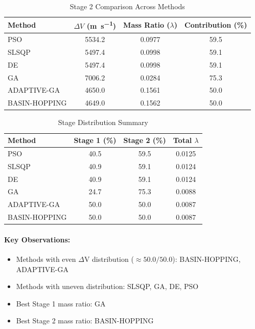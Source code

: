 \documentclass{article}
\begin{document}
\begin{table}[H]
\centering
\caption{Stage 2 Comparison Across Methods}
\begin{tabular}{lS[table-format=4.1]S[table-format=1.4]S[table-format=3.1]}
\toprule
Method & {$\Delta V$ (\si{\meter\per\second})} & {Mass Ratio ($\lambda$)} & {Contribution (\%)} \\
\midrule
PSO          & 5534.2 & 0.0977 & 59.5 \\
SLSQP        & 5497.4 & 0.0998 & 59.1 \\
DE           & 5497.4 & 0.0998 & 59.1 \\
GA           & 7006.2 & 0.0284 & 75.3 \\
ADAPTIVE-GA  & 4650.0 & 0.1561 & 50.0 \\
BASIN-HOPPING & 4649.0 & 0.1562 & 50.0 \\
\bottomrule
\end{tabular}
\end{table}

\begin{table}[H]
\centering
\caption{Stage Distribution Summary}
\begin{tabular}{lS[table-format=4.1]S[table-format=4.1]S[table-format=1.4]}
\toprule
Method & {Stage 1 (\%)} & {Stage 2 (\%)} & {Total $\lambda$} \\
\midrule
PSO          & 40.5 & 59.5 & 0.0125 \\
SLSQP        & 40.9 & 59.1 & 0.0124 \\
DE           & 40.9 & 59.1 & 0.0124 \\
GA           & 24.7 & 75.3 & 0.0088 \\
ADAPTIVE-GA  & 50.0 & 50.0 & 0.0087 \\
BASIN-HOPPING & 50.0 & 50.0 & 0.0087 \\
\bottomrule
\end{tabular}
\end{table}

\paragraph{Key Observations:}
\begin{itemize}
\item Methods with even $\Delta$V distribution ($\approx50.0/50.0$): BASIN-HOPPING, ADAPTIVE-GA
\item Methods with uneven distribution: SLSQP, GA, DE, PSO
\item Best Stage 1 mass ratio: GA
\item Best Stage 2 mass ratio: BASIN-HOPPING
\end{itemize}
\end{document}
